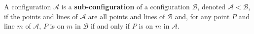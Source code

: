 A configuration $\mathcal{A}$ is a \textbf{sub-configuration} of a configuration $\mathcal{B}$, denoted $\mathcal{A} < \mathcal{B}$, if the points and lines of $\mathcal{A}$ are all points and lines of $\mathcal{B}$ and, for any point $P$ and line $m$ of $\mathcal{A}$, $P$ is on $m$ in $\mathcal{B}$ if and only if $P$ is on $m$ in $\mathcal{A}$.
